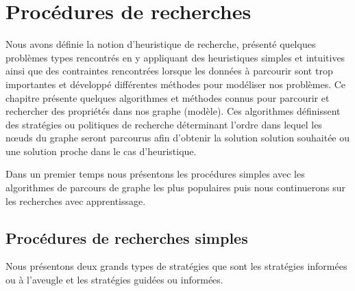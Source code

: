 \chapter{Procédures de recherches}

\label{Chapter2} %

Nous avons définie la notion d'heuristique de recherche, présenté quelques problèmes types rencontrés en y appliquant des heuristiques simples et intuitives ainsi que des contraintes rencontrées lorsque les données à parcourir sont trop importantes et développé différentes méthodes pour modéliser nos problèmes. 
Ce chapitre présente quelques algorithmes et méthodes connus pour parcourir et rechercher des propriétés dans nos graphe (modèle).
Ces algorithmes définissent des stratégies ou politiques de recherche déterminant l'ordre dans lequel les nœuds du graphe seront parcourus afin d'obtenir la solution solution souhaitée ou une solution proche dans le cas d'heuristique.

Dans un premier temps nous présentons les procédures simples avec les algorithmes de parcours de graphe les plus populaires puis nous continuerons sur les recherches avec apprentissage.


\section{Procédures de recherches simples}
Nous présentons deux grands types de stratégies que sont les stratégies informées ou à l'aveugle et les stratégies guidées ou informées.


